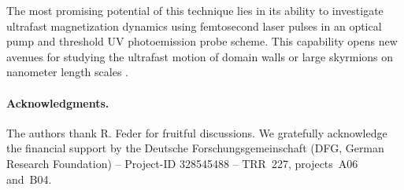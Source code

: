 \documentclass[prl,twocolumn,floatfix,superscriptaddress,aps]{revtex4-2}
\begin{document}
The most promising potential of this technique lies in its ability to investigate ultrafast magnetization dynamics using femtosecond laser pulses in an optical pump and threshold UV photoemission probe scheme. This capability opens new avenues for studying the ultrafast motion of domain walls \cite{parkin2008} or large skyrmions on nanometer length scales \cite{goebel2019,jani2021,kern2022}.

\paragraph{Acknowledgments.} 
The authors thank R. Feder for fruitful discussions. We gratefully acknowledge the financial support by the Deutsche Forschungsgemeinschaft (DFG, German Research Foundation) -- Project-ID 328545488 -- TRR~227, projects~A06 and~B04.

% 


\end{document}

